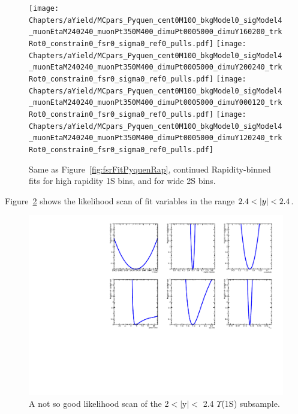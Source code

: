 \begin{figure}
\begin{center}
\texttt{[image: Chapters/aYield/MCpars\_Pyquen\_cent0M100\_bkgModel0\_sigModel4\_muonEtaM240240\_muonPt350M400\_dimuPt0005000\_dimuY160200\_trkRot0\_constrain0\_fsr0\_sigma0\_ref0\_pulls.pdf]}
\texttt{[image: Chapters/aYield/MCpars\_Pyquen\_cent0M100\_bkgModel0\_sigModel4\_muonEtaM240240\_muonPt350M400\_dimuPt0005000\_dimuY200240\_trkRot0\_constrain0\_fsr0\_sigma0\_ref0\_pulls.pdf]}
\texttt{[image: Chapters/aYield/MCpars\_Pyquen\_cent0M100\_bkgModel0\_sigModel4\_muonEtaM240240\_muonPt350M400\_dimuPt0005000\_dimuY000120\_trkRot0\_constrain0\_fsr0\_sigma0\_ref0\_pulls.pdf]}
\texttt{[image: Chapters/aYield/MCpars\_Pyquen\_cent0M100\_bkgModel0\_sigModel4\_muonEtaM240240\_muonPt350M400\_dimuPt0005000\_dimuY120240\_trkRot0\_constrain0\_fsr0\_sigma0\_ref0\_pulls.pdf]}
\caption{Same as Figure~\ref{fig:fsrFitPyquenRap}, continued
  Rapidity-binned fits for high rapidity 1S bins, and for wide 2S bins.}
\label{fig:fsrFitPyquenRap2}
\end{center}
\end{figure}

Figure~\ref{fig:likelihoodScanExampleHiRap} shows the likelihood scan
of fit variables in the range $2.4 < \vert y\vert < 2.4$.

\begin{figure}
\begin{center}
\includegraphics[width=1\textwidth]{Chapters/aYield/likelihoodScanExampleRap2-2p4.pdf}  
\caption{A not so good likelihood scan of the 2$<|$y$|< $ 2.4 $\Upsilon$(1S)
  subsample.}
\label{fig:likelihoodScanExampleHiRap}
\end{center}
\end{figure}
